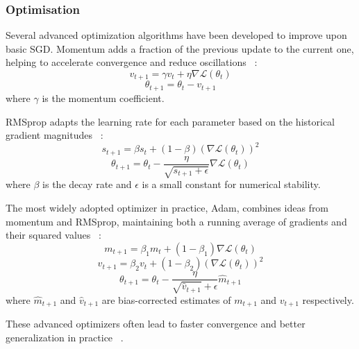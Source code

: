 \documentclass[a4paper, oneside]{discothesis}
\begin{document}
\subsubsection{Optimisation}

Several advanced optimization algorithms have been developed to improve upon basic SGD. Momentum adds a fraction of the previous update to the current one, helping to accelerate convergence and reduce oscillations ~\cite{sutskever2013importance}:
\begin{equation}
    v_{t+1} = \gamma v_t + \eta \nabla \mathcal{L}(\theta_t)
\end{equation}
\begin{equation}
    \theta_{t+1} = \theta_t - v_{t+1}
\end{equation}
where $\gamma$ is the momentum coefficient.

RMSprop adapts the learning rate for each parameter based on the historical gradient magnitudes ~\cite{tieleman2012lecture}:
\begin{equation}
    s_{t+1} = \beta s_t + (1-\beta)(\nabla \mathcal{L}(\theta_t))^2
\end{equation}
\begin{equation}
    \theta_{t+1} = \theta_t - \frac{\eta}{\sqrt{s_{t+1} + \epsilon}} \nabla \mathcal{L}(\theta_t)
\end{equation}
where $\beta$ is the decay rate and $\epsilon$ is a small constant for numerical stability.

The most widely adopted optimizer in practice, Adam, combines ideas from momentum and RMSprop, maintaining both a running average of gradients and their squared values ~\cite{kingma2014adam}:
\begin{equation}
    m_{t+1} = \beta_1 m_t + (1-\beta_1)\nabla \mathcal{L}(\theta_t)
\end{equation}
\begin{equation}
    v_{t+1} = \beta_2 v_t + (1-\beta_2)(\nabla \mathcal{L}(\theta_t))^2
\end{equation}
\begin{equation}
    \theta_{t+1} = \theta_t - \frac{\eta}{\sqrt{\hat{v}_{t+1}} + \epsilon} \hat{m}_{t+1}
\end{equation}
where $\hat{m}_{t+1}$ and $\hat{v}_{t+1}$ are bias-corrected estimates of $m_{t+1}$ and $v_{t+1}$ respectively.

These advanced optimizers often lead to faster convergence and better generalization in practice ~\cite{ruder2016overview}.
\end{document}
